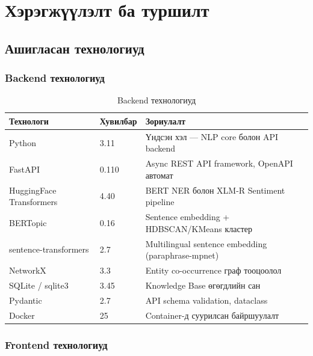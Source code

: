 \chapter{Хэрэгжүүлэлт ба туршилт}


\section{Ашигласан технологиуд}

\subsection{Backend технологиуд}

\begin{table}[h!]
\centering
\renewcommand{\arraystretch}{1.4}
\begin{tabular}{|l|l|p{6cm}|}
\hline
\textbf{Технологи} & \textbf{Хувилбар} & \textbf{Зориулалт} \\ \hline
Python & 3.11 & Үндсэн хэл — NLP core болон API backend \\ \hline
FastAPI & 0.110 & Async REST API framework, OpenAPI автомат \\ \hline
HuggingFace Transformers & 4.40 & BERT NER болон XLM-R Sentiment pipeline \\ \hline
BERTopic & 0.16 & Sentence embedding + HDBSCAN/KMeans кластер \\ \hline
sentence-transformers & 2.7 & Multilingual sentence embedding (paraphrase-mpnet) \\ \hline
NetworkX & 3.3 & Entity co-occurrence граф тооцоолол \\ \hline
SQLite / sqlite3 & 3.45 & Knowledge Base өгөгдлийн сан \\ \hline
Pydantic & 2.7 & API schema validation, dataclass \\ \hline
Docker & 25 & Container-д суурилсан байршуулалт \\ \hline
\end{tabular}
\caption{Backend технологиуд}
\label{tab:backend_tech}
\end{table}

\subsection{Frontend технологиуд}

